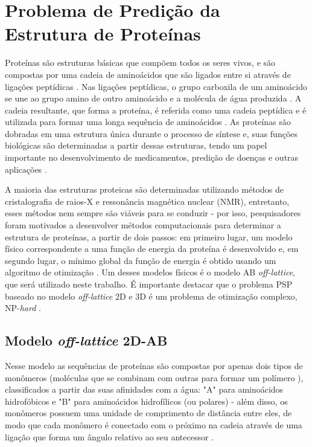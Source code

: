 
\section{Problema de Predição da Estrutura de Proteínas}
\label{sec:psp}

Proteínas são estruturas básicas que compõem todos os seres vivos, e são compostas por uma cadeia de aminoácidos que são ligados entre si através de ligações peptídicas \cite{parpinelli}. Nas ligações peptídicas, o grupo carboxila de um aminoácido se une ao grupo amino de outro aminoácido e a molécula de água produzida \cite{jana4}. A cadeia resultante, que forma a proteína, é referida como uma cadeia peptídica e é utilizada para formar uma longa sequência de aminoácidos \cite{jana4}. As proteínas são dobradas em uma estrutura única durante o processo de síntese e, suas funções biológicas são determinadas a partir dessas estruturas, tendo um papel importante no desenvolvimento de medicamentos, predição de doenças e outras aplicações \cite{jana2}.

A maioria das estruturas proteicas são determinadas utilizando métodos de cristalografia de raios-X e ressonância magnética nuclear (NMR), entretanto, esses métodos nem sempre são viáveis para se conduzir - por isso, pesquisadores foram motivados a desenvolver métodos computacionais para determinar a estrutura de proteínas, a partir de dois passos: em primeiro lugar, um modelo físico correspondente a uma função de energia da proteína é desenvolvido e, em segundo lugar, o mínimo global da função de energia é obtido usando um algoritmo de otimização \cite{jana2}. Um desses modelos físicos é o modelo AB \textit{off-lattice}, que será utilizado neste trabalho. É importante destacar que o problema PSP baseado no modelo \textit{off-lattice} 2D e 3D é um problema de otimização complexo, NP-\textit{hard} \cite{jana4}.

\subsection{Modelo \textit{off-lattice} 2D-AB}

Nesse modelo as sequências de proteínas são compostas por apenas dois tipos de monômeros (moléculas que se combinam com outras para formar um polímero \cite{rudin}), classificados a partir das suas afinidades com a água: "A" \- para aminoácidos hidrofóbicos e "B" \- para aminoácidos hidrofílicos (ou polares) - além disso, os monômeros possuem uma unidade de comprimento de distância entre eles, de modo que cada monômero é conectado com o próximo na cadeia através de uma ligação que forma um ângulo relativo ao seu antecessor \cite{parpinelli}.

